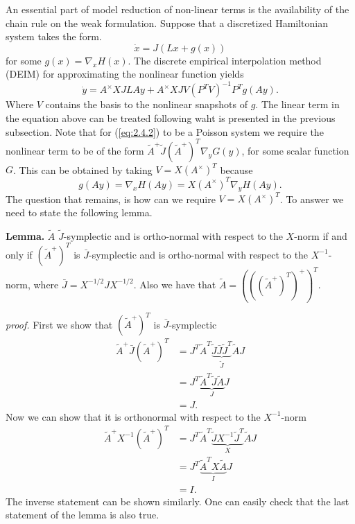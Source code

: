 \documentclass[12pt]{article}
\begin{document}
An essential part of model reduction of non-linear terms is the availability of the chain rule on the weak formulation. Suppose that a discretized Hamiltonian system takes the form.
\begin{equation} \label{eq:2.4.1}
	\dot x = J (L x + g(x) ) 
\end{equation}
for some $g(x) = \nabla_x H(x)$. The discrete empirical interpolation method (DEIM) for approximating the nonlinear function yields
\begin{equation} \label{eq:2.4.2}
	\dot y = A^{\times} X J LAy + A^{\times} X J V(P^TV)^{-1} P^T g(Ay).
\end{equation}
Where $V$ contains the basis to the nonlinear snapshots of $g$. The linear term in the equation above can be treated following waht is presented in the previous subsection. Note that for (\ref{eq:2.4.2}) to be a Poisson system we require the nonlinear term to be of the form $\tilde A ^+ \tilde J (\tilde A ^+)^T \nabla_y G(y)$, for some scalar function $G$. This can be obtained by taking $V = X (A^{\times})^T$ because
\begin{equation}
 	g(Ay) = \nabla_x H(Ay) = X (A^{\times})^T \nabla_y H(Ay).
\end{equation}
The question that remains, is how can we require $V = X (A^{\times})^T$. To answer we need to state the following lemma.

\textbf{Lemma. }$\tilde A$ $\tilde J$-symplectic and is ortho-normal with respect to the $X$-norm if and only if $(\tilde A^+)^T$ is $\bar J$-symplectic and is ortho-normal with respect to the $X^{-1}$-norm, where $\bar J = X^{-1/2}JX^{-1/2}$. Also we have that $\tilde A = \left( \left( \left(\tilde A^+\right)^T \right)^+ \right)^T$.

\emph{proof. }First we show that $(\tilde A^+)^T$ is $\bar J$-symplectic
\begin{equation}
\begin{aligned}
	\tilde A^+ \bar J (\tilde A^+)^T &= J^T \tilde A^T\underbrace{ \tilde J \bar J \tilde J ^T }_{\tilde J} \tilde A J \\
	&= J^T \underbrace{ \tilde A^T \tilde J \tilde A}_{J} J \\
	&= J.
\end{aligned}
\end{equation}
Now we can show that it is orthonormal with respect to the $X^{-1}$-norm
\begin{equation}
\begin{aligned}
	\tilde A^+ X^{-1} (\tilde A^+)^T &= J^T \tilde A^T \underbrace{ \tilde J X^{-1} \tilde J ^T}_{X} \tilde A J \\
	&= J^T \underbrace{ \tilde A^T X \tilde A }_{I} J \\
	&= I.
\end{aligned}
\end{equation}
The inverse statement can be shown similarly. One can easily check that the last statement of the lemma is also true.
\end{document}
